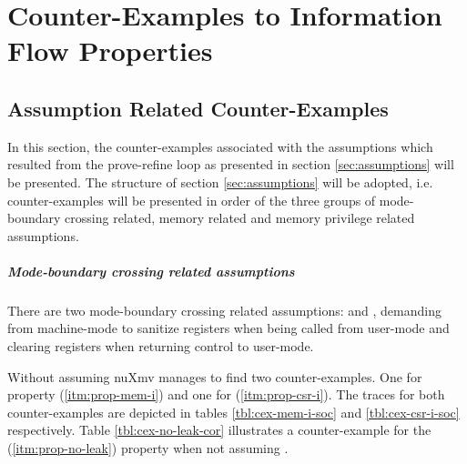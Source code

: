 \chapter{Counter-Examples to Information Flow Properties}

\section{Assumption Related Counter-Examples}
\label{app:cexs}

In this section, the counter-examples associated with the assumptions which resulted from the prove-refine loop as presented in section \ref{sec:assumptions} will be presented.
The structure of section \ref{sec:assumptions} will be adopted, i.e. counter-examples will be presented in order of the three groups of mode-boundary crossing related, memory related and memory privilege related assumptions.

\paragraph{Mode-boundary crossing related assumptions}
There are two mode-boundary crossing related assumptions:  and , demanding from machine-mode to sanitize registers when being called from user-mode and clearing registers when returning control to user-mode.

Without assuming  nuXmv manages to find two counter-examples.
One for property  (\ref{itm:prop-mem-i}) and one for  (\ref{itm:prop-csr-i}).
The traces for both counter-examples are depicted in tables \ref{tbl:cex-mem-i-soc} and \ref{tbl:cex-csr-i-soc} respectively.
Table \ref{tbl:cex-no-leak-cor} illustrates a counter-example for the  (\ref{itm:prop-no-leak}) property when not assuming .

